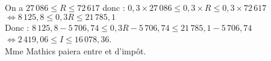    On a $27\,086\leq R\leq 72\,617$ donc : $0,3\times27\,086\leq 0,3\times R\leq 0,3\times72\,617$ \\
   $\iff 8\,125,8\leq0,3R\leq21\,785,1$ \\
   Donc : $8\,125,8-5\,706,74\leq0,3R-5\,706,74\leq21\,785,1-5\,706,74$ \\
   $\iff 2\,419,06\leq I\leq 16\,078,36$. \\
   {\blue Mme Mathics paiera entre  et  d'impôt}. \\
